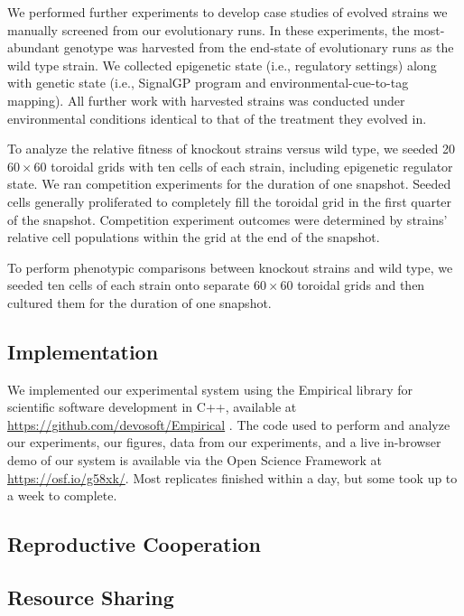We performed further experiments to develop case studies of evolved strains we manually screened from our evolutionary runs.
In these experiments, the most-abundant genotype was harvested from the end-state of evolutionary runs as the wild type strain.
We collected epigenetic state (i.e., regulatory settings) along with genetic state (i.e., SignalGP program and environmental-cue-to-tag mapping).
All further work with harvested strains was conducted under environmental conditions identical to that of the treatment they evolved in.

To analyze the relative fitness of knockout strains versus wild type, we seeded 20 $60 \times 60$ toroidal grids with ten cells of each strain, including epigenetic regulator state.
We ran competition experiments for the duration of one snapshot.
Seeded cells generally proliferated to completely fill the toroidal grid in the first quarter of the snapshot.
Competition experiment outcomes were determined by strains' relative cell populations within the grid at the end of the snapshot.

To perform phenotypic comparisons between knockout strains and wild type, we seeded ten cells of each strain onto separate $60 \times 60$ toroidal grids and then cultured them for the duration of one snapshot.

\subsection{Implementation} \label{sup:implementation}

We implemented our experimental system using the Empirical library for scientific software development in C++, available at \url{https://github.com/devosoft/Empirical} \citep{charles_ofria_2019_2575607}.
The code used to perform and analyze our experiments, our figures, data from our experiments, and a live in-browser demo of our system is available via the Open Science Framework at \url{https://osf.io/g58xk/}.
Most replicates finished within a day, but some took up to a week to complete.

\subsection{Reproductive Cooperation} \label{sup:reproductive-cooperation}



\subsection{Resource Sharing} \label{sec:resource-sharing}

